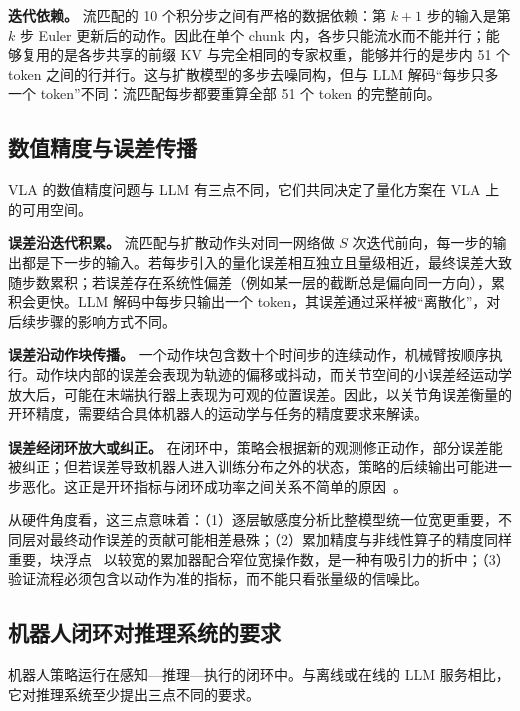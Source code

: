 \documentclass[a4paper,10.5pt]{ctexart}
\begin{document}
\textbf{迭代依赖。} 流匹配的 10 个积分步之间有严格的数据依赖：第 $k+1$ 步的输入是第 $k$ 步 Euler 更新后的动作。因此在单个 chunk 内，各步只能流水而不能并行；能够复用的是各步共享的前缀 KV 与完全相同的专家权重，能够并行的是步内 51 个 token 之间的行并行。这与扩散模型的多步去噪同构，但与 LLM 解码“每步只多一个 token”不同：流匹配每步都要重算全部 51 个 token 的完整前向。

\subsection{数值精度与误差传播}\label{sec:precision}

VLA 的数值精度问题与 LLM 有三点不同，它们共同决定了量化方案在 VLA 上的可用空间。

\textbf{误差沿迭代积累。} 流匹配与扩散动作头对同一网络做 $S$ 次迭代前向，每一步的输出都是下一步的输入。若每步引入的量化误差相互独立且量级相近，最终误差大致随步数累积；若误差存在系统性偏差（例如某一层的截断总是偏向同一方向），累积会更快。LLM 解码中每步只输出一个 token，其误差通过采样被“离散化”，对后续步骤的影响方式不同。

\textbf{误差沿动作块传播。} 一个动作块包含数十个时间步的连续动作，机械臂按顺序执行。动作块内部的误差会表现为轨迹的偏移或抖动，而关节空间的小误差经运动学放大后，可能在末端执行器上表现为可观的位置误差。因此，以关节角误差衡量的开环精度，需要结合具体机器人的运动学与任务的精度要求来解读。

\textbf{误差经闭环放大或纠正。} 在闭环中，策略会根据新的观测修正动作，部分误差能被纠正；但若误差导致机器人进入训练分布之外的状态，策略的后续输出可能进一步恶化。这正是开环指标与闭环成功率之间关系不简单的原因~\cite{vlaquantbench}。

从硬件角度看，这三点意味着：（1）逐层敏感度分析比整模型统一位宽更重要，不同层对最终动作误差的贡献可能相差悬殊；（2）累加精度与非线性算子的精度同样重要，块浮点~\cite{msfp,mx} 以较宽的累加器配合窄位宽操作数，是一种有吸引力的折中；（3）验证流程必须包含以动作为准的指标，而不能只看张量级的信噪比。

\subsection{机器人闭环对推理系统的要求}\label{sec:loop}

机器人策略运行在感知—推理—执行的闭环中。与离线或在线的 LLM 服务相比，它对推理系统至少提出三点不同的要求。
\end{document}
